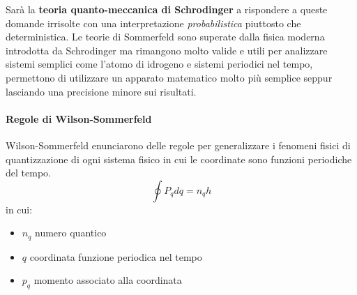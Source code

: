 Sarà la \textbf{teoria quanto-meccanica di Schrodinger} a rispondere a queste domande irrisolte con una interpretazione \textit{probabilistica} piuttosto che deterministica.
Le teorie di Sommerfeld sono superate dalla fisica moderna introdotta da Schrodinger ma rimangono molto valide e utili per analizzare sistemi semplici come l'atomo di idrogeno e sistemi periodici nel tempo, permettono di utilizzare un apparato matematico molto più semplice seppur lasciando una precisione minore sui risultati.

\paragraph{Regole di Wilson-Sommerfeld}
Wilson-Sommerfeld enunciarono delle regole per generalizzare i fenomeni fisici di quantizzazione di ogni sistema fisico in cui le coordinate sono funzioni periodiche del tempo.
\begin{equation}
\oint P_q dq = n_q h
\label{integrale_pq}
\end{equation}
in cui:
\begin{itemize}
\item $n_q$ numero quantico
\item $q$ coordinata funzione periodica nel tempo
\item $p_q$ momento associato alla coordinata
\end{itemize}

